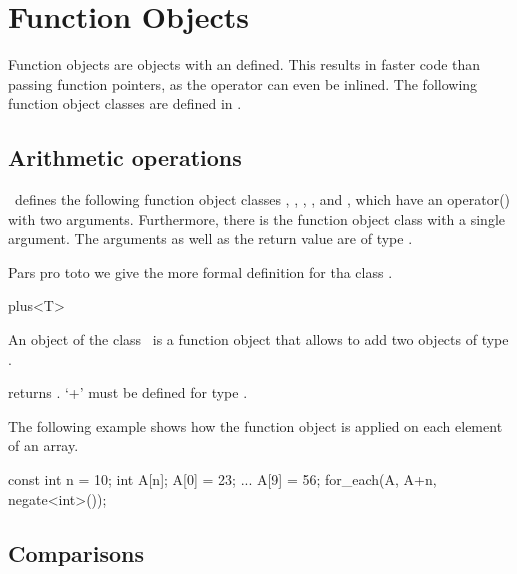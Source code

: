 
\cleardoublepage
\chapter{Function Objects}

Function objects are objects with an  defined. This results
in faster code than passing function pointers, as the operator can
even be inlined. The following function object classes are defined in \stl.

\section{Arithmetic operations}


\stl\  defines the following function object classes ,
, , , and
, which have an operator() with two arguments. 
Furthermore, there is the function object class  with
a single argument. The arguments as well as the return value are of
type .

Pars pro toto we give the more formal definition for tha class .

\begin{ccClassTemplate}{plus<T>}

\ccDefinition
An object of the class \ccClassName\ is a function object that allows
to add two objects of type .


\ccOperations

{returns .
\ccPrecond `+' must be defined for type .}
\end{ccClassTemplate} 


\ccExample

The following example shows how the function object 
is applied on each element of an array.

\begin{cprog}
{
    const int n = 10;
    int A[n];
    A[0] = 23;
    ...
    A[9] = 56;
    for_each(A, A+n, negate<int>());
}
\end{cprog}

\newpage

\section{Comparisons}

